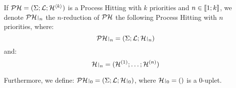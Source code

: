\begin{definition} 
  If $\mathcal{PH} = (\Sigma; \mathcal{L}; \mathcal{H}^{\langle k \rangle})$ is a Process Hitting with $k$ priorities and $n \in \llbracket 1; k \rrbracket$, we denote $\restriction{\PH}{n}$  the $n$-reduction of $\mathcal{PH}$ the following Process Hitting with $n$ priorities, where:
  $$\restriction{\PH}{n} = (\PHs; \PHl; \restriction{\PHa}{n})$$
  and:
  $$\restriction{\PHa}{n} = (\PHa^{(1)}; \dots; \PHa^{(n)})$$
  
  Furthermore, we define: $\restriction{\PH}{0} = (\PHs; \PHl; \restriction{\PHa}{0})$, where $\restriction{\PHa}{0} = ()$ is a $0$-uplet.
\end{definition}

\begin{comment} %
\pref{fig:runningPH-1} represents a PH $(\PHs,\PHl,\PHa)$ with
$\PHs = \{a,b,c\}$,
$\PHl_a = \{a_0,a_1,a_2\}$,
$\PHl_b = \{b_0, b_1\}$,
$\PHl_c = \{c_0, c_1\}$, and
\begin{align*}
\PHa & = \{
	\PHfrappe{a_2}{b_1}{b_0},
&&  \PHfrappe{b_0}{a_2}{a_1},
&&	\PHfrappe{c_0}{a_2}{a_1},\\
&&& \PHfrappe{b_0}{a_1}{a_0},
&&	\PHfrappe{c_0}{a_1}{a_0},\\
&&& \PHfrappe{b_1}{a_0}{a_1},
&&	\PHfrappe{c_1}{a_0}{a_1},\\
&&& \PHfrappe{b_1}{a_1}{a_2},
&&	\PHfrappe{c_1}{a_1}{a_2} \}\enspace.
\end{align*}
The action $h=\PHfrappe{b_1}{a_1}{a_2}$ is playable in the state
$s = \PHstate{b_1,a_1,c_0}$; and $s\PHplay h=\PHstate{b_1,a_2,c_0}$.
%
\begin{figure}[t]
\centering
\scalebox{1.3}{
\begin{tikzpicture}
\TSort{(0,0)}{a}{3}{r}
\TSort{(-3,0.5)}{b}{2}{l}
\TSort{(3,0.5)}{c}{2}{r}
%
\THit{b_1}{very thick}{a_0}{.west}{a_1}
\THit{b_1}{very thick}{a_1}{.north west}{a_2}
\THit{b_0}{}{a_2}{.west}{a_1}
\THit{b_0}{}{a_1}{.west}{a_0}
%
\path[bounce, bend left=60]
\TBounce{a_1}{very thick}{a_2}{.south}
\TBounce{a_0}{very thick}{a_1}{.south}
;
\path[bounce, bend right=60]
\TBounce{a_2}{}{a_1}{.north}
\TBounce{a_1}{}{a_0}{.north}
;
%
\THit{c_1}{very thick}{a_0}{.east}{a_1}
\THit{c_1}{very thick}{a_1}{.north east}{a_2}
\THit{c_0}{}{a_2}{.east}{a_1}
\THit{c_0}{}{a_1}{.east}{a_0}
%
\path[bounce, bend right=60]
\TBounce{a_1}{very thick}{a_2}{.south east}
\TBounce{a_0}{very thick}{a_1}{.south east}
;
\path[bounce, bend left=60]
\TBounce{a_2}{}{a_1}{.north}

\end{comment}
